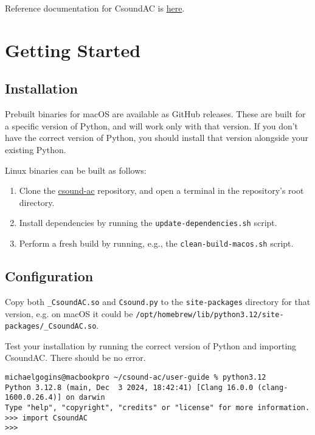 \documentclass[letterpaper,10pt,DIV=12]{scrartcl}
\begin{document}
\noindent Reference documentation for CsoundAC is \href{https://github.com/gogins/csound-ac/blob/master/csound-ac.pdf}{here}.

\section{Getting Started}

\subsection{Installation}

Prebuilt binaries for macOS are available as GitHub releases. These are built for a specific version of Python, and will work only with that version. If you don't have the correct version of Python, you should install that version alongside your existing Python. 

Linux binaries can be built as follows:

\begin{enumerate}
\item Clone the \href{https://github.com/gogins/csound-ac}{csound-ac} repository, and open a terminal in the repository's root directory.
\item Install dependencies by running the \texttt{update-dependencies.sh} script.
\item Perform a fresh build by running, e.g., the \texttt{clean-build-macos.sh} script.
\end{enumerate}

\subsection{Configuration}

Copy both \texttt{\_CsoundAC.so} and \texttt{Csound.py} to the \texttt{site-packages} directory for that version, e.g. on macOS it could be \lstinline|/opt/homebrew/lib/python3.12/site-packages/_CsoundAC.so|.

Test your installation by running the correct version of Python and importing CsoundAC. There should be no error.

\begin{lstlisting}[basicstyle=\small\ttfamily]
michaelgogins@macbookpro ~/csound-ac/user-guide % python3.12
Python 3.12.8 (main, Dec  3 2024, 18:42:41) [Clang 16.0.0 (clang-1600.0.26.4)] on darwin
Type "help", "copyright", "credits" or "license" for more information.
>>> import CsoundAC
>>> 
\end{lstlisting}
\end{document}
